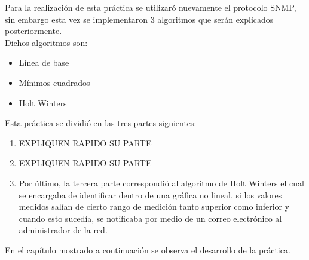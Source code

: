 Para la realización de esta práctica se utilizaró nuevamente el protocolo SNMP, sin embargo esta vez se implementaron 3 algoritmos que serán explicados posteriormente.\\
Dichos algoritmos son:
\begin{itemize}
\item Línea de base
\item Mínimos cuadrados
\item Holt Winters
\end{itemize} 

Esta práctica se dividió en las tres partes siguientes:
\begin{enumerate}
\item EXPLIQUEN RAPIDO SU PARTE
\item EXPLIQUEN RAPIDO SU PARTE
\item Por último, la tercera parte correspondió al algoritmo de Holt Winters el cual se encargaba de identificar dentro de una gráfica no lineal, si los valores medidos salían de cierto rango de medición tanto superior como inferior y cuando esto sucedía, se notificaba por medio de un correo electrónico al administrador de la red.
\end{enumerate}

En el capítulo mostrado a continuación se observa el desarrollo de la práctica.



 